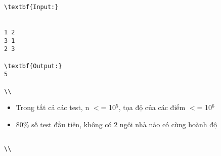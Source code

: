 \begin{verbatim}
\textbf{Input:}


1 2
3 1
2 3

\textbf{Output:}
5

\\\end{verbatim}
\begin{itemize}
	\item Trong tất cả các test, n $<$= 10$^5$, tọa độ của các điểm $<$= 10$^6$
	\item 80\% số test đầu tiên, không có 2 ngôi nhà nào có cùng hoành độ
\end{itemize}
\begin{verbatim}

\\\end{verbatim}